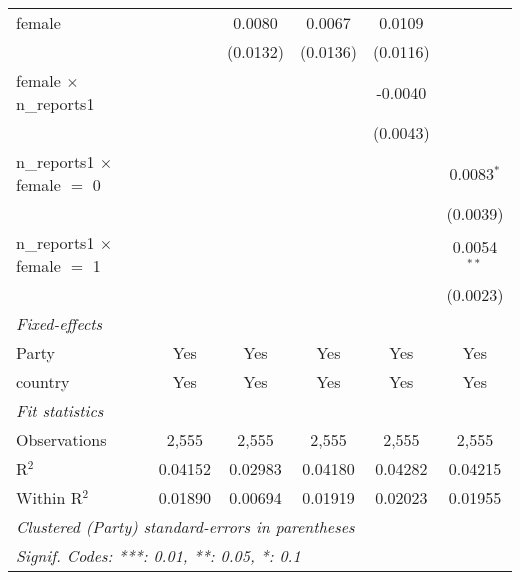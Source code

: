 \begin{tabular}{lccccc}
   female                              &               & 0.0080       & 0.0067        & 0.0109        &   \\   
                                       &               & (0.0132)     & (0.0136)      & (0.0116)      &   \\   
   female $\times$ n\_reports1         &               &              &               & -0.0040       &   \\   
                                       &               &              &               & (0.0043)      &   \\   
   n\_reports1 $\times$ female $=$ 0   &               &              &               &               & 0.0083$^{*}$\\   
                                       &               &              &               &               & (0.0039)\\   
   n\_reports1 $\times$ female $=$ 1   &               &              &               &               & 0.0054$^{**}$\\   
                                       &               &              &               &               & (0.0023)\\   
   \midrule
   \emph{Fixed-effects}\\
   Party                               & Yes           & Yes          & Yes           & Yes           & Yes\\  
   country                             & Yes           & Yes          & Yes           & Yes           & Yes\\  
   \midrule
   \emph{Fit statistics}\\
   Observations                        & 2,555         & 2,555        & 2,555         & 2,555         & 2,555\\  
   R$^2$                               & 0.04152       & 0.02983      & 0.04180       & 0.04282       & 0.04215\\  
   Within R$^2$                        & 0.01890       & 0.00694      & 0.01919       & 0.02023       & 0.01955\\  
   \midrule \midrule
   \multicolumn{6}{l}{\emph{Clustered (Party) standard-errors in parentheses}}\\
   \multicolumn{6}{l}{\emph{Signif. Codes: ***: 0.01, **: 0.05, *: 0.1}}\\
\end{tabular}
\par\endgroup



